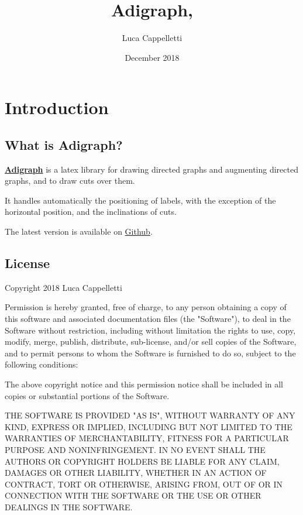\documentclass{report}
\title{Adigraph, \AdigraphVersionNumber}
\author{Luca Cappelletti}
\date{December 2018}
\begin{document}
\maketitle

{\hypersetup{hidelinks}
	\tableofcontents  %
}

\chapter{Introduction}
\section{What is Adigraph?}
\textbf{\href{https://ctan.org/pkg/adigraph}{Adigraph}} is a latex library for drawing directed graphs and augmenting directed graphs, and to draw cuts over them.

It handles automatically the positioning of labels, with the exception of the horizontal position, and the inclinations of cuts.

The latest version is available on \href{https://github.com/LucaCappelletti94/adigraph}{Github}.

\section{License}
Copyright 2018 Luca Cappelletti

Permission is hereby granted, free of charge, to any person obtaining a copy of this software and associated documentation files (the "Software"), to deal in the Software without restriction, including without limitation the rights to use, copy, modify, merge, publish, distribute, sub-license, and/or sell copies of the Software, and to permit persons to whom the Software is furnished to do so, subject to the following conditions:

The above copyright notice and this permission notice shall be included in all copies or substantial portions of the Software.

THE SOFTWARE IS PROVIDED "AS IS", WITHOUT WARRANTY OF ANY KIND, EXPRESS OR IMPLIED, INCLUDING BUT NOT LIMITED TO THE WARRANTIES OF MERCHANTABILITY, FITNESS FOR A PARTICULAR PURPOSE AND NONINFRINGEMENT. IN NO EVENT SHALL THE AUTHORS OR COPYRIGHT HOLDERS BE LIABLE FOR ANY CLAIM, DAMAGES OR OTHER LIABILITY, WHETHER IN AN ACTION OF CONTRACT, TORT OR OTHERWISE, ARISING FROM, OUT OF OR IN CONNECTION WITH THE SOFTWARE OR THE USE OR OTHER DEALINGS IN THE SOFTWARE.\\
\end{document}
